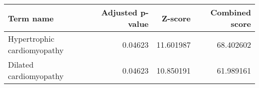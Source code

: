 \begin{tabular}{lrrr}
\toprule
                  Term name &  Adjusted p-value &   Z-score &  Combined score \\
\midrule
Hypertrophic cardiomyopathy &           0.04623 & 11.601987 &       68.402602 \\
     Dilated cardiomyopathy &           0.04623 & 10.850191 &       61.989161 \\
\bottomrule
\end{tabular}

